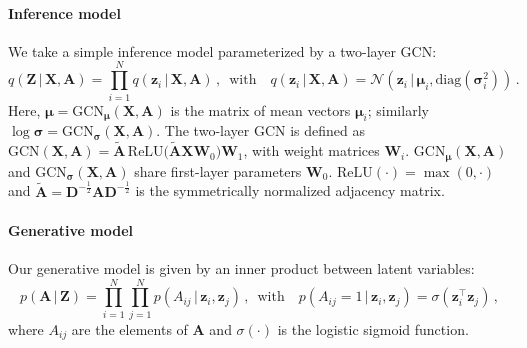\documentclass{article}
\begin{document}
\paragraph{Inference model}
We take a simple inference model parameterized by a two-layer GCN:
\begin{equation}
\textstyle
q(\mathbf{Z}\,|\,\mathbf{X},\mathbf{A}) = \prod_{i=1}^N q(\mathbf{z}_i\,|\,\mathbf{X},\mathbf{A})\, , \,\,\, \text{with} \quad q(\mathbf{z}_i\,|\,\mathbf{X},\mathbf{A}) = \mathcal{N}(\mathbf{z}_i\,|\, \boldsymbol{\mu}_i, \mathrm{diag}(\boldsymbol{\sigma}_i^2)) \, .
\end{equation}
Here, $\boldsymbol{\mu} = \mathrm{GCN}_{\boldsymbol{\mu}}(\mathbf{X}, \mathbf{A})$ is the matrix of mean vectors $\boldsymbol{\mu}_i$; similarly $\log\boldsymbol{\sigma} = \mathrm{GCN}_{\boldsymbol{\sigma}}(\mathbf{X}, \mathbf{A})$. The two-layer GCN is defined as $\mathrm{GCN}(\mathbf{X}, \mathbf{A}) = \mathbf{\tilde{A}}\,\mathrm{ReLU}\bigl(\mathbf{\tilde{A}}\mathbf{X}\mathbf{W}_0\bigr)\mathbf{W}_1$, with weight matrices $\mathbf{W}_i$.  $\mathrm{GCN}_{\boldsymbol{\mu}}(\mathbf{X}, \mathbf{A})$ and $\mathrm{GCN}_{\boldsymbol{\sigma}}(\mathbf{X}, \mathbf{A})$ share first-layer parameters $\mathbf{W}_0$. $\mathrm{ReLU}(\cdot)=\max(0,\cdot)$ and $\mathbf{\tilde{A}}=\mathbf{D}^{-\frac{1}{2}}\mathbf{A}\mathbf{D}^{-\frac{1}{2}}$ is the symmetrically normalized adjacency matrix.

\paragraph{Generative model}
Our generative model is given by an inner product between latent variables:
\begin{equation}
\textstyle
p\left(\mathbf{A\,|\,\mathbf{Z}}\right) = \prod_{i=1}^N\prod_{j=1}^N p\left(A_{ij}\,|\,\mathbf{z}_i,\mathbf{z}_j\right)\, , \,\,\, \text{with} \quad p\left(A_{ij}=1\,|\,\mathbf{z}_i,\mathbf{z}_j\right) = \sigma(\mathbf{z}_i^\top\mathbf{z}_j) \, ,
\end{equation}
where $A_{ij}$ are the elements of $\mathbf{A}$ and $\sigma(\cdot)$ is the logistic sigmoid function.
\end{document}
